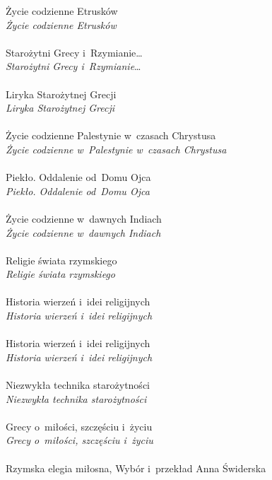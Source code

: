 \documentclass[a4paper,11pt]{article}
\begin{document}
\Jest  Życie codzienne Etrusków \\
\Powin \emph{Życie codzienne Etrusków} \\
 \\
\Jest  Starożytni Grecy i~Rzymianie\ldots \\
\Powin \emph{Starożytni Grecy i~Rzymianie}\ldots \\
 \\
\Jest  Liryka Starożytnej Grecji \\
\Powin \emph{Liryka Starożytnej Grecji} \\
 \\
\Jest  Życie codzienne Palestynie w~czasach Chrystusa \\
\Powin \emph{Życie codzienne w~Palestynie w~czasach Chrystusa} \\
 \\
\Jest  Piekło. Oddalenie od~Domu Ojca \\
\Powin \emph{Piekło. Oddalenie od~Domu Ojca} \\
 \\
\Jest  Życie codzienne w~dawnych Indiach \\
\Powin \emph{Życie codzienne w~dawnych Indiach} \\
 \\
\Jest  Religie świata rzymskiego \\
\Powin \emph{Religie świata rzymskiego} \\
 \\
\Jest  Historia wierzeń i~idei religijnych \\
\Powin \emph{Historia wierzeń i~idei religijnych} \\
 \\
\Jest  Historia wierzeń i~idei religijnych \\
\Powin \emph{Historia wierzeń i~idei religijnych} \\
 \\
\Jest  Niezwykła technika starożytności \\
\Powin \emph{Niezwykła technika starożytności} \\
 \\
\Jest  Grecy o~miłości, szczęściu i~życiu \\
\Powin \emph{Grecy o~miłości, szczęściu i~życiu} \\
 \\
\Jest  Rzymska elegia miłosna, Wybór i~przekład Anna Świderska \\
\end{document}
